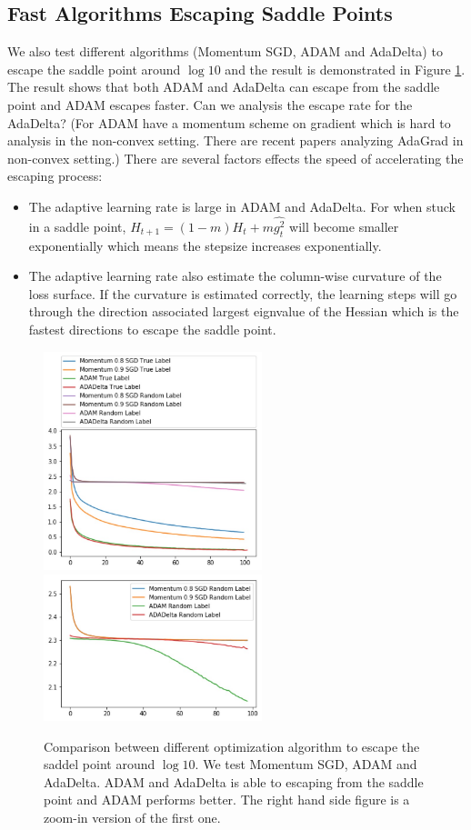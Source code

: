 \documentclass{article}
\theoremstyle{plain}
\theoremstyle{definition}
\begin{document}
\subsection{Fast Algorithms Escaping Saddle Points}

We also test different algorithms (Momentum SGD, ADAM and AdaDelta) to escape the saddle point around $\log 10$ and the result is demonstrated in Figure \ref{optsadd}. The result shows that both ADAM and AdaDelta can escape from the saddle point and ADAM escapes faster. Can we analysis the escape rate for the AdaDelta? (For ADAM have a momentum scheme on gradient which is hard to analysis in the non-convex setting. There are recent papers analyzing AdaGrad in non-convex setting.) There are several factors effects the speed of accelerating the escaping process:

\begin{itemize}
	\item The adaptive learning rate is large in ADAM and AdaDelta. For when stuck in a saddle point, $H_{t+1}=(1-m)H_t+m\hat{g_t^2}$ will become smaller exponentially which means the stepsize increases exponentially.
	\item The adaptive learning rate also estimate the column-wise curvature of the loss surface. If the curvature is estimated correctly, the learning steps will go through the direction associated largest eignvalue of the Hessian which is the fastest directions to escape the saddle point.
\end{itemize}

\begin{figure}[htp]
	\centering
	\includegraphics[width=2.5in]{opt.jpg}
	\includegraphics[width=2.5in]{saddle.jpg}
	\caption{Comparison between different optimization algorithm to escape the saddel point around $\log 10$. We test Momentum SGD, ADAM and AdaDelta. ADAM and AdaDelta is able to escaping from the saddle point and ADAM performs better. The right hand side figure is a zoom-in version of the first one.}
	\label{optsadd}
\end{figure}
\end{document}
